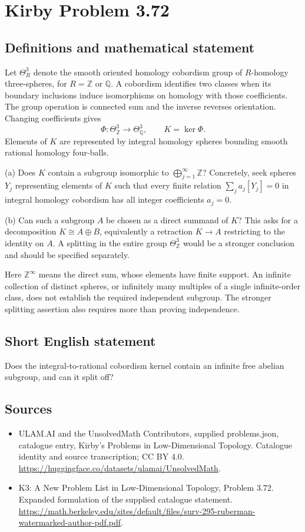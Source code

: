 \documentclass[11pt,a4paper]{article}
\begin{document}
\section*{Kirby Problem 3.72}\label{statement}

\subsection{Definitions and mathematical statement}
Let $\Theta^3_R$ denote the smooth oriented homology cobordism group of $R$-homology three-spheres, for $R=\mathbb Z$ or $\mathbb Q$. A cobordism identifies two classes when its boundary inclusions induce isomorphisms on homology with those coefficients. The group operation is connected sum and the inverse reverses orientation. Changing coefficients gives
\[
\Phi:\Theta^3_{\mathbb Z}\longrightarrow\Theta^3_{\mathbb Q},
\qquad K=\ker\Phi.
\]
Elements of $K$ are represented by integral homology spheres bounding smooth rational homology four-balls.

(a) Does $K$ contain a subgroup isomorphic to $\bigoplus_{j=1}^{\infty}\mathbb Z$? Concretely, seek spheres $Y_j$ representing elements of $K$ such that every finite relation $\sum_j a_j[Y_j]=0$ in integral homology cobordism has all integer coefficients $a_j=0$.

(b) Can such a subgroup $A$ be chosen as a direct summand of $K$? This asks for a decomposition $K\cong A\oplus B$, equivalently a retraction $K\to A$ restricting to the identity on $A$. A splitting in the entire group $\Theta^3_{\mathbb Z}$ would be a stronger conclusion and should be specified separately.

Here $\mathbb Z^\infty$ means the direct sum, whose elements have finite support. An infinite collection of distinct spheres, or infinitely many multiples of a single infinite-order class, does not establish the required independent subgroup. The stronger splitting assertion also requires more than proving independence.
\subsection{Short English statement}
Does the integral-to-rational cobordism kernel contain an infinite free abelian subgroup, and can it split off?
\subsection{Sources}
\begin{itemize}
\item[S1] ULAM.AI and the UnsolvedMath Contributors, supplied problems.json, catalogue entry, Kirby's Problems in Low-Dimensional Topology. Catalogue identity and source transcription; CC BY 4.0.
\url{https://huggingface.co/datasets/ulamai/UnsolvedMath}.
\item[S2] K3: A New Problem List in Low-Dimensional Topology, Problem 3.72. Expanded formulation of the supplied catalogue statement.
\url{https://math.berkeley.edu/sites/default/files/surv-295-ruberman-watermarked-author-pdf.pdf}.
\end{itemize}
\end{document}
